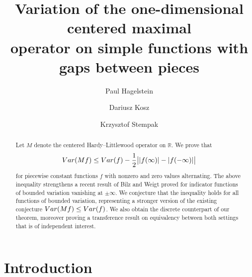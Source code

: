 \documentclass[leqno,11pt]{amsart}
\numberwithin{equation}{section}
\numberwithin{theorem}{section}
\newcommand{\RR}{\mathbb{R}}
\newcommand{\Var}{{\rm Var}}
\begin{document}
	
	\title[Variation of the centered maximal operator]{Variation of the one-dimensional centered maximal \\ operator on simple functions with gaps between pieces}
	
	
	\author[P. Hagelstein]{Paul Hagelstein}
	\address{Paul Hagelstein (\textnormal{Paul\_Hagelstein@baylor.edu}) \newline
		Baylor University, Waco, Texas 76798, USA} 
	
	\author{Dariusz Kosz}
	\address{ Dariusz Kosz (\textnormal{Dariusz.Kosz@pwr.edu.pl}) \newline
	Wroc{\l}aw University of Science and Technology,
	50-370 Wrocław, Poland
	}

	\author[K. Stempak]{Krzysztof Stempak}
	\address{Krzysztof Stempak (\textnormal{Krz.Stempak@gmail.com}) -093 Kie\l{}cz\'ow, Poland}    
	
	\begin{abstract}
	Let $M$ denote the centered Hardy--Littlewood operator on $\RR$. We prove that
	\[
	\Var (Mf)\le \Var (f) - \frac12\big| |f(\infty)|-|f(-\infty)|\big|
	\]
	for piecewise constant functions $f$ with nonzero and zero values alternating. The above inequality strengthens a recent result of Bilz and Weigt \cite{BW} proved for
	indicator functions of bounded variation vanishing at $\pm\infty$.
	We conjecture that the inequality holds for all functions of bounded variation, representing a stronger version of the existing conjecture $\Var (Mf)\le \Var (f)$. We also obtain the discrete
	counterpart of our theorem, moreover proving a transference result on equivalency between both settings that is of independent interest.
	\end{abstract}
	
	\maketitle		
	
	\section{Introduction} \label{S1}
	 
\end{document}
